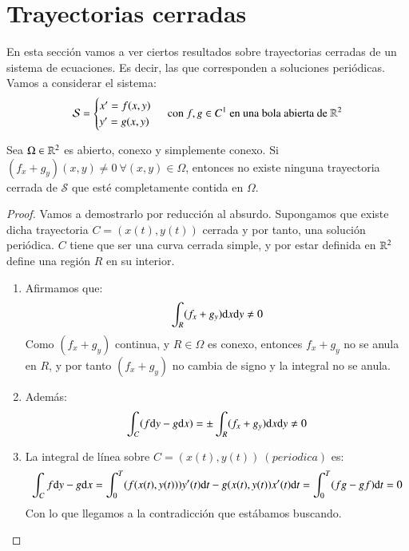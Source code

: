 \section{Trayectorias cerradas}
En esta sección vamos a ver ciertos resultados sobre trayectorias cerradas de un sistema de ecuaciones. Es decir, las que corresponden a soluciones periódicas. Vamos a considerar el sistema:
$$
    \mathcal{S} =
    \begin{cases}
        x' = f(x, y)\\
        y' = g(x, y)
    \end{cases} \text{ con } f, g \in C^1 \text{ en una bola abierta de } \mathbb{R}^2
$$
\begin{thm}\label{pro:bendixson}
    Sea $\Omega \in \mathbb{R}^2$ es abierto, conexo y simplemente conexo. Si $(f_x + g_y)(x, y) \neq 0\ \forall (x, y) \in \Omega$, entonces no existe ninguna trayectoria cerrada de $\mathcal{S}$ que esté completamente contida en $\Omega$.
\end{thm}
\begin{proof}
    Vamos a demostrarlo por reducción al absurdo. Supongamos que existe dicha trayectoria $C = (x(t), y(t))$ cerrada y por tanto, una solución periódica. $C$ tiene que ser una curva cerrada simple, y por estar definida en $\mathbb{R}^2$ define una región $R$ en su interior.
    \begin{enumerate}
        \item Afirmamos que:
            $$
                \int_R (f_x + g_y) \mathrm{d} x \mathrm{d} y \neq 0
            $$
            Como $(f_x + g_y)$ continua, y $R\in \Omega$ es conexo, entonces $f_x + g_y$ no se anula en $R$, y por tanto $(f_x + g_y)$ no cambia de signo y la integral no se anula.
        \item Además:
            $$
                \int_C (f \mathrm{d} y - g \mathrm{d} x) = \pm \int_R (f_x + g_y) \mathrm{d} x \mathrm{d} y \neq 0
            $$
        \item La integral de línea sobre $C = (x(t), y(t))\ (periodica)$ es:
            $$
                \int_C f \mathrm{d} y - g \mathrm{d} x = \int_0^T (f(x(t), y(t))) y'(t) \mathrm{d} t - g(x(t), y(t)) x'(t) \mathrm{d} t = \int_0^T (fg - gf) \mathrm{d} t = 0
            $$
            Con lo que llegamos a la contradicción que estábamos buscando.
    \end{enumerate}
\end{proof}
